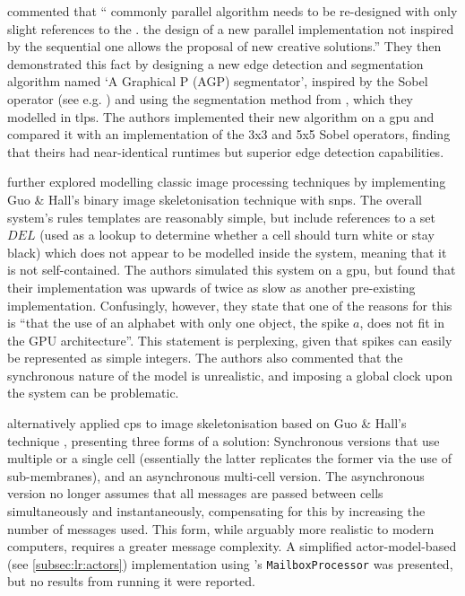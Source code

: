 \citeauthor{Diaz-Pernil2013} \cite{Diaz-Pernil2013} commented that \enquote{\textelp{} commonly  parallel algorithm needs to be re-designed with only slight references to the .  \textelp{} the design of a new parallel implementation not inspired by the sequential one allows \textelp{} the proposal of new creative solutions.}  They then demonstrated this fact by designing a new edge detection and segmentation algorithm named `A Graphical P (AGP) segmentator', inspired by the Sobel operator (see e.g. \cite{Nixon2012}) and using the segmentation method from \cite{Christinal2011}, which they modelled in \gls{tlps}.  The authors implemented their new algorithm on a \gls{gpu} and compared it with an implementation of the 3x3 and 5x5 Sobel operators, finding that theirs had near-identical runtimes but superior edge detection capabilities.

\citeauthor{Diaz-Pernil2013a} \cite{Diaz-Pernil2013a} further explored modelling classic image processing techniques by implementing Guo \& Hall's binary image skeletonisation technique \cite{Guo1989} with \gls{snps}.  The overall system's rules templates are reasonably simple, but include references to a set \(DEL\) (used as a lookup to determine whether a cell should turn white or stay black) which does not appear to be modelled inside the system, meaning that it is not self-contained.  The authors simulated this system on a \gls{gpu}, but found that their implementation was upwards of twice as slow as another pre-existing implementation.  Confusingly, however, they state that one of the reasons for this is \enquote{that the use of an alphabet with only one object, the spike \(a\), does not fit in the GPU architecture}.  This statement is perplexing, given that spikes can easily be represented as simple integers.  The authors also commented that the synchronous nature of the model is unrealistic, and imposing a global clock upon the system can be problematic.

\citeauthor{Nicolescu2014} \cite{Nicolescu2014} alternatively applied \gls{cps} to image skeletonisation based on Guo \& Hall's technique \cite{Guo1989}, presenting three forms of a solution: Synchronous versions that use multiple or a single cell (essentially the latter replicates the former via the use of sub-membranes), and an asynchronous multi-cell version.  The asynchronous version no longer assumes that all messages are passed between cells simultaneously and instantaneously, compensating for this by increasing the number of messages used.  This form, while arguably more realistic to modern computers, requires a greater message complexity. A simplified \Gls{actor}-model-based (see \cref{subsec:lr:actors}) implementation using \fsharp{}'s \texttt{MailboxProcessor} \cite[ch.~11]{Syme2015a} was presented, but no results from running it were reported.

